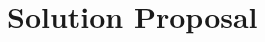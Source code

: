 \chapter{Solution Proposal}


\lipsum 


\cite{dynabook} 
\cite{distractions1,distractions2,interruptions}
\cite{forgetting}
